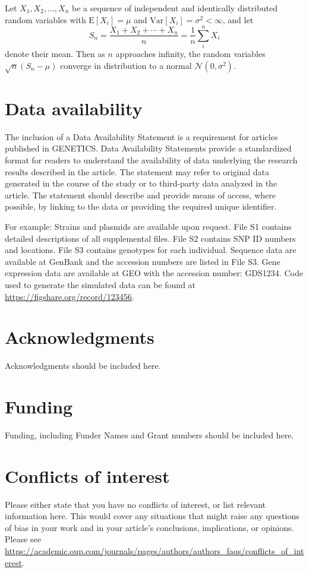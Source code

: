 \documentclass[10pt,twocolumn,twoside,lineno]{gsajnl}
\begin{document}
Let $X_1, X_2, \ldots, X_n$ be a sequence of independent and identically distributed random variables with $\text{E}[X_i] = \mu$ and $\text{Var}[X_i] = \sigma^2 < \infty$, and let
\begin{equation}
S_n = \frac{X_1 + X_2 + \cdots + X_n}{n}
      = \frac{1}{n}\sum_{i}^{n} X_i
\label{eq:refname1}
\end{equation}
denote their mean. Then as $n$ approaches infinity, the random variables $\sqrt{n}(S_n - \mu)$ converge in distribution to a normal $\mathcal{N}(0, \sigma^2)$.

\section{Data availability}

The inclusion of a Data Availability Statement is a requirement for articles published in GENETICS. Data Availability Statements provide a standardized format for readers to understand the availability of data underlying the research results described in the article. The statement may refer to original data generated in the course of the study or to third-party data analyzed in the article. The statement should describe and provide means of access, where possible, by linking to the data or providing the required unique identifier.

For example: Strains and plasmids are available upon request. File S1 contains detailed descriptions of all supplemental files. File S2 contains SNP ID numbers and locations. File S3 contains genotypes for each individual. Sequence data are available at GenBank and the accession numbers are listed in File S3. Gene expression data are available at GEO with the accession number: GDS1234. Code used to generate the simulated data can be found at \url{https://figshare.org/record/123456}.

\section{Acknowledgments}
Acknowledgments should be included here.

\section{Funding}
Funding, including Funder Names and Grant numbers should be included here.

\section{Conflicts of interest}
Please either state that you have no conflicts of interest, or list relevant information here.  This would cover any situations that might raise any questions of bias in your work and in your article’s conclusions, implications, or opinions. Please see \url{https://academic.oup.com/journals/pages/authors/authors_faqs/conflicts_of_interest}.


\end{document}
